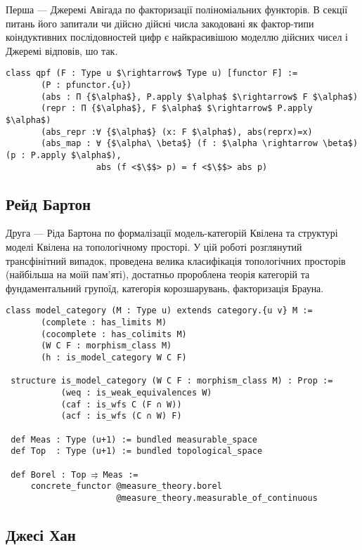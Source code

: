 Перша --- Джеремі Авігада по факторизації поліноміальних функторів.
В секції питань його запитали чи дійсно дійсні числа закодовані як
фактор-типи коіндуктивних послідовностей цифр є найкрасивішою
моделлю дійсних чисел і Джеремі відповів, шо так.

\begin{lstlisting}[mathescape=true]
 class qpf (F : Type u $\rightarrow$ Type u) [functor F] :=
       (P : pfunctor.{u})
       (abs : Π {$\alpha$}, P.apply $\alpha$ $\rightarrow$ F $\alpha$)
       (repr : Π {$\alpha$}, F $\alpha$ $\rightarrow$ P.apply $\alpha$)
       (abs_repr :∀ {$\alpha$} (x: F $\alpha$), abs(reprx)=x)
       (abs_map : ∀ {$\alpha\ \beta$} (f : $\alpha \rightarrow \beta$) (p : P.apply $\alpha$),
                  abs (f <$\$$> p) = f <$\$$> abs p)
\end{lstlisting}

\subsection*{Рейд Бартон}

Друга --- Ріда Бартона по формалізації модель-категорій Квілена та структурі
моделі Квілена на топологічному просторі. У цій роботі розглянутий трансфінітний
випадок, проведена велика класифікація топологічних просторів (найбільша на моїй
пам'яті), достатньо пророблена теорія категорій та фундаментальний групоїд,
категорія корозшарувань, факторизація Брауна. 

\begin{lstlisting}[mathescape=true]
 class model_category (M : Type u) extends category.{u v} M :=
       (complete : has_limits M)
       (cocomplete : has_colimits M)
       (W C F : morphism_class M)
       (h : is_model_category W C F)

 structure is_model_category (W C F : morphism_class M) : Prop :=
           (weq : is_weak_equivalences W)
           (caf : is_wfs C (F ∩ W))
           (acf : is_wfs (C ∩ W) F)

 def Meas : Type (u+1) := bundled measurable_space
 def Top  : Type (u+1) := bundled topological_space

 def Borel : Top ⥤ Meas :=
     concrete_functor @measure_theory.borel
                      @measure_theory.measurable_of_continuous
\end{lstlisting}

\subsection*{Джесі Хан}

